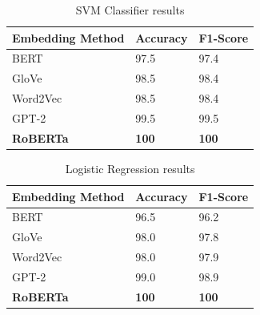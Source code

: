 \begin{table}[hbt!]
\begin{threeparttable}
\caption{SVM Classifier results}
\label{svc_results}
\begin{tabular}{lll}
\toprule
\headrow Embedding Method & Accuracy & F1-Score\\
\midrule
 BERT     &       97.5 &       97.4 \\
 GloVe    &       98.5 &       98.4 \\
 Word2Vec &       98.5 &       98.4 \\
 GPT-2    &       99.5 &       99.5 \\
 \textbf{RoBERTa}  &       \textbf{100} &       \textbf{100} \\
\bottomrule
\end{tabular}
\end{threeparttable}
\end{table}

\begin{table}[hbt!]
\begin{threeparttable}
\caption{Logistic Regression results}
\label{lr_results}
\begin{tabular}{lll}
\toprule
\headrow Embedding Method & Accuracy & F1-Score\\
\midrule
 BERT     &       96.5 &       96.2 \\
 GloVe    &       98.0 &       97.8 \\
 Word2Vec &       98.0 &       97.9 \\
 GPT-2    &       99.0 &       98.9 \\
 \textbf{RoBERTa}  &       \textbf{100} &       \textbf{100} \\
\bottomrule
\end{tabular}
\end{threeparttable}
\end{table}

